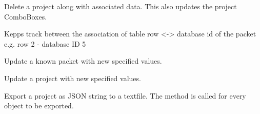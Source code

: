 \documentclass[letterpaper,10pt,english]{sphinxmanual}
\begin{document}
\begin{fulllineitems}
\begin{fulllineitems}
\end{fulllineitems}


\begin{fulllineitems}
\label{\detokenize{src:src.ManagerTab.ManagerTab.deleteProject}}
Delete a project along with associated data. This also updates the project ComboBoxes.

\end{fulllineitems}


\begin{fulllineitems}
\label{\detokenize{src:src.ManagerTab.ManagerTab.dumpsRowIDs}}
Kepps track between the association of
table row \textless{}-\textgreater{} database id of the packet
e.g. row 2 - database ID 5

\end{fulllineitems}


\begin{fulllineitems}
\label{\detokenize{src:src.ManagerTab.ManagerTab.editKnownPacket}}
Update a known packet with new specified values.

\end{fulllineitems}


\begin{fulllineitems}
\label{\detokenize{src:src.ManagerTab.ManagerTab.editProject}}
Update a project with new specified values.

\end{fulllineitems}


\begin{fulllineitems}
\label{\detokenize{src:src.ManagerTab.ManagerTab.exportProject}}
Export a project as JSON string to a textfile.
The  method is called for every object to be exported.


\end{fulllineitems}
\end{fulllineitems}
\end{document}
